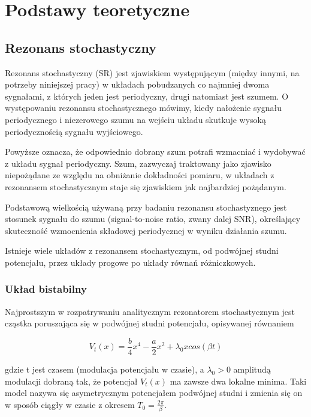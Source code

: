   \section{Podstawy teoretyczne}
  
  \subsection{Rezonans stochastyczny}
  
  Rezonans stochastyczny (SR) jest zjawiskiem występującym (między innymi, na potrzeby niniejszej pracy) w układach pobudzanych co najmniej dwoma sygnałami, z których jeden jest periodyczny, drugi natomiast jest szumem. O występowaniu rezonansu stochastycznego mówimy, kiedy nałożenie sygnału periodycznego i niezerowego szumu na wejściu układu skutkuje wysoką periodycznością sygnału wyjściowego.
  
  Powyższe oznacza, że odpowiednio dobrany szum potrafi wzmacniać i wydobywać z układu sygnał periodyczny. Szum, zazwyczaj traktowany jako zjawisko niepożądane ze względu na obniżanie dokładności pomiaru, w układach z rezonansem stochastycznym staje się zjawiskiem jak najbardziej pożądanym. 
  
  Podstawową wielkością używaną przy badaniu rezonansu stochastyznego jest stosunek sygnału do szumu (signal-to-noise ratio, zwany dalej SNR), określający skuteczność wzmocnienia składowej periodycznej w wyniku działania szumu.

  Istnieje wiele układów z rezonansem stochastycznym, od podwójnej studni potencjału, przez układy progowe po układy równań różniczkowych.

  \subsubsection{Układ bistabilny}
  \label{sec:uklad_bistabilny}

  Najprostszym w rozpatrywaniu analitycznym rezonatorem stochastycznym jest cząstka poruszająca się w  podwójnej studni potencjału, opisywanej równaniem \cite{mcnamara}

  \begin{equation} \label{sr:1}
    V_t(x) = \frac{b}{4} x^4 - \frac{a}{2} x^2 + \lambda_0 x cos(\beta t)
  \end{equation}

  gdzie t jest czasem (modulacja potencjału w czasie), a $\lambda_0 > 0$ amplitudą modulacji dobraną tak, że potencjał $V_t(x)$ ma zawsze dwa lokalne minima. Taki model nazywa się asymetrycznym potencjałem podwójnej studni i zmienia się on w sposób ciągły w czasie z okresem $T_0 = \frac{2 \pi}{\beta}$.

